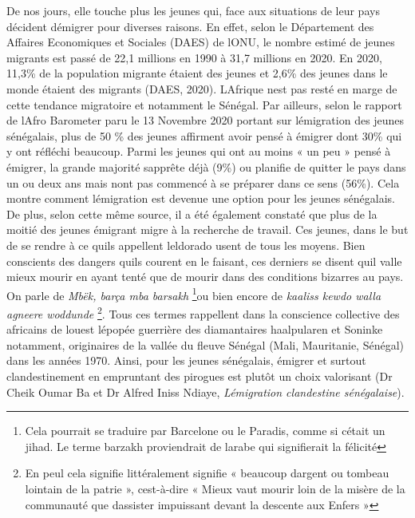 \documentclass[
  letterpaper,
  DIV=11,
  numbers=noendperiod]{scrartcl}
\begin{document}
De nos jours, elle touche plus les jeunes qui, face aux situations de
leur pays décident d\textquotesingle émigrer pour diverses raisons. En
effet, selon le Département des Affaires Economiques et Sociales (DAES)
de l\textquotesingle ONU, le nombre estimé de jeunes migrants est passé
de 22,1 millions en 1990 à 31,7 millions en 2020. En 2020, 11,3\% de la
population migrante étaient des jeunes et 2,6\% des jeunes dans le monde
étaient des migrants (DAES, 2020). L\textquotesingle Afrique
n\textquotesingle est pas resté en marge de cette tendance migratoire et
notamment le Sénégal. Par ailleurs, selon le rapport de
l\textquotesingle Afro Barometer paru le 13 Novembre 2020 portant sur
l\textquotesingle émigration des jeunes sénégalais, plus de 50 \% des
jeunes affirment avoir pensé à émigrer dont 30\% qui y ont réfléchi
beaucoup. Parmi les jeunes qui ont au moins « un peu » pensé à émigrer,
la grande majorité s\textquotesingle apprête déjà (9\%) ou planifie de
quitter le pays dans un ou deux ans mais n\textquotesingle ont pas
commencé à se préparer dans ce sens (56\%). Cela montre comment
l\textquotesingle émigration est devenue une option pour les jeunes
sénégalais. De plus, selon cette même source, il a été également
constaté que plus de la moitié des jeunes émigrant migre à la recherche
de travail. Ces jeunes, dans le but de se rendre à ce
qu\textquotesingle ils appellent l\textquotesingle eldorado usent de
tous les moyens. Bien conscients des dangers qu\textquotesingle ils
courent en le faisant, ces derniers se disent qu\textquotesingle il
valle mieux mourir en ayant tenté que de mourir dans des conditions
bizarres au pays. On parle de \emph{Mbëk, barça mba barsakh}
\footnote{Cela pourrait se traduire par \textquotesingle Barcelone ou le
  Paradis, comme si c\textquotesingle était un jihad. Le terme barzakh
  proviendrait de l\textquotesingle arabe qui signifierait la félicité}ou
bien encore de \emph{kaaliss kewdo walla agneere woddunde} \footnote{En
  peul cela signifie littéralement signifie « beaucoup
  d\textquotesingle argent ou tombeau lointain de la patrie »,
  c\textquotesingle est-à-dire « Mieux vaut mourir loin de la misère de
  la communauté que d\textquotesingle assister impuissant devant la
  descente aux Enfers »}. Tous ces termes rappellent dans la conscience
collective des africains de l\textquotesingle ouest
l\textquotesingle épopée guerrière des diamantaires haalpularen et
Soninke notamment, originaires de la vallée du fleuve Sénégal (Mali,
Mauritanie, Sénégal) dans les années 1970. Ainsi, pour les jeunes
sénégalais, émigrer et surtout clandestinement en empruntant des
pirogues est plutôt un choix valorisant (Dr Cheik Oumar Ba et Dr Alfred
Iniss Ndiaye, \emph{L\textquotesingle émigration clandestine
sénégalaise}).
\end{document}
